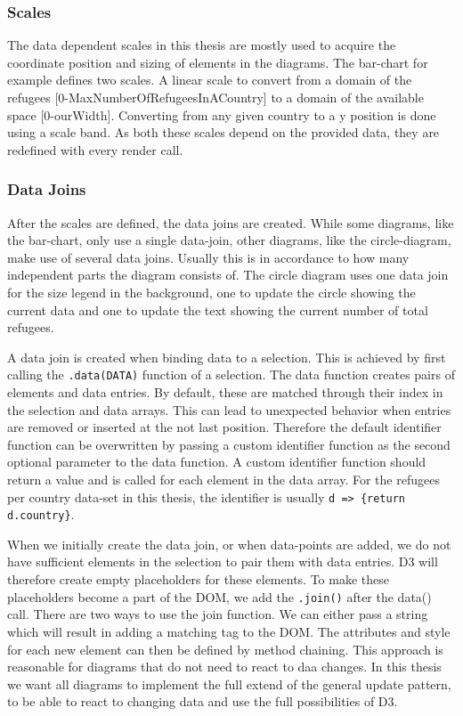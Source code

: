 \subsubsection{Scales}
The data dependent scales in this thesis are mostly used to acquire the coordinate position and sizing of elements in the diagrams. The bar-chart for example defines two scales. A linear scale to convert from a domain of the refugees [0-MaxNumberOfRefugeesInACountry] to a domain of the available space [0-ourWidth]. Converting from any given country to a y position is done using a scale band. As both these scales depend on the provided data, they are redefined with every render call.

\subsubsection{Data Joins}
After the scales are defined, the data joins are created. While some diagrams, like the bar-chart, only use a single data-join, other diagrams, like the circle-diagram, make use of several data joins. Usually this is in accordance to how many independent parts the diagram consists of. The circle diagram uses one data join for the size legend in the background, one to update the circle showing the current data and one to update the text showing the current number of total refugees.

A data join is created when binding data to a selection. This is achieved by first calling the \verb|.data(DATA)| function of a selection. The data function creates pairs of elements and data entries. By default, these are matched through their index in the selection and data arrays. This can lead to unexpected behavior when entries are removed or inserted at the not last position. Therefore the default identifier function can be overwritten by passing a custom identifier function as the second optional parameter to the data function. A custom identifier function should return a value and is called for each element in the data array. For the refugees per country data-set in this thesis, the identifier is usually \verb|d => {return d.country}|.

When we initially create the data join, or when data-points are added, we do not have sufficient elements in the selection to pair them with data entries. D3 will therefore create empty placeholders for these elements. To make these placeholders become a part of the DOM, we add the \verb|.join()| after the data() call. There are two ways to use the join function. We can either pass a string which will result in adding a matching tag to the DOM. The attributes and style for each new element can then be defined by method chaining. This approach is reasonable for diagrams that do not need to react to daa changes. In this thesis we want all diagrams to implement the full extend of the general update pattern, to be able to react to changing data and use the full possibilities of D3.


